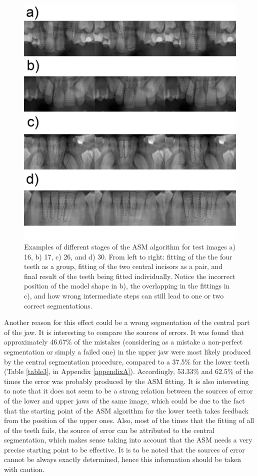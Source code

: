 \documentclass[a4paper,11pt,twoside]{article}
\begin{document}
\begin{figure}
\centering
\includegraphics[width=0.95\columnwidth]{finalSegmentation.png}
\caption{Examples of different stages of the ASM algorithm for test images a) 16, b) 17, c) 26, and d) 30. From left to right: fitting of the the four teeth as a group, fitting of the two central incisors as a pair, and final result of the teeth being fitted individually. Notice the incorrect position of the model shape in b), the overlapping in the fittings in c), and how wrong intermediate steps can still lead to one or two correct segmentations. }
\label{finalSegmentation}
\end{figure}

Another reason for this effect could be a wrong segmentation of the central part of the jaw. It is interesting to compare the sources of errors. It was found that approximately 46.67\% of the mistakes (considering as a mistake a non-perfect segmentation or simply a failed one) in the upper jaw were most likely produced by the central segmentation procedure, compared to a 37.5\% for the lower teeth (Table \ref{table3}, in Appendix \ref{appendixA}). Accordingly, 53.33\% and 62.5\% of the times the error was probably produced by the ASM fitting. It is also interesting to note that it does not seem to be a strong relation between the sources of error of the lower and upper jaws of the same image, which could be due to the fact that the starting point of the ASM algorithm for the lower teeth takes feedback from the position of the upper ones. Also, most of the times that the fitting of all of the teeth fails, the source of error can be attributed to the central segmentation, which makes sense taking into account that the ASM needs a very precise starting point to be effective. It is to be noted that the sources of error cannot be always exactly determined, hence this information should be taken with caution.
\end{document}
